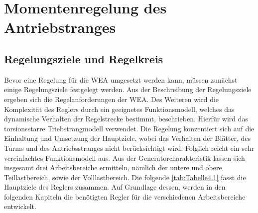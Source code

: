\section{Momentenregelung des Antriebstranges} \label{regelung}
\subsection{Regelungsziele und Regelkreis}
Bevor eine Regelung für die WEA umgesetzt werden kann, müssen zunächst einige Regelungsziele festgelegt werden. Aus der Beschreibung der Regelungsziele ergeben sich die Regelanforderungen der WEA. Des Weiteren wird die Komplexität des Reglers durch ein geeignetes Funktionsmodell, welches das dynamische Verhalten der Regelstrecke bestimmt, beschrieben. Hierfür wird das torsionsstarre Triebstrangmodell verwendet. Die Regelung konzentiert sich auf die Einhaltung und Umsetzung der Hauptziele, wobei das Verhalten der Blätter, des Turms und des Antriebsstranges nicht berücksichtigt wird. Folglich reicht ein sehr vereinfachtes Funktionsmodell aus. Aus der Generatorcharakteristik lassen sich insgesamt drei Arbeitsbereiche ermitteln, nämlich der untere und obere Teillastbereich, sowie der Volllastbereich. Die folgende \autoref{tab:Tabelle4.1} fasst die Hauptziele des Reglers zusammen. Auf Grundlage dessen, werden in den folgenden Kapiteln die benötigten Regler für die verschiedenen Arbeitsbereiche entwickelt.
\\


